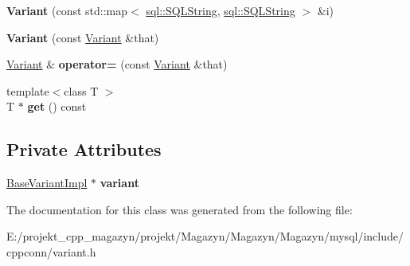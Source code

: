 \begin{DoxyCompactItemize}
{\bfseries Variant} (const std\+::map$<$ \hyperlink{classsql_1_1_s_q_l_string}{sql\+::\+S\+Q\+L\+String}, \hyperlink{classsql_1_1_s_q_l_string}{sql\+::\+S\+Q\+L\+String} $>$ \&i)
\item 
\hypertarget{classsql_1_1_variant_ad3c0e0299b1a39feb507cf435143262a}{}\label{classsql_1_1_variant_ad3c0e0299b1a39feb507cf435143262a} 
{\bfseries Variant} (const \hyperlink{classsql_1_1_variant}{Variant} \&that)
\item 
\hypertarget{classsql_1_1_variant_a3776937e0bb01168bba0fd1ddec56718}{}\label{classsql_1_1_variant_a3776937e0bb01168bba0fd1ddec56718} 
\hyperlink{classsql_1_1_variant}{Variant} \& {\bfseries operator=} (const \hyperlink{classsql_1_1_variant}{Variant} \&that)
\item 
\hypertarget{classsql_1_1_variant_ab5e2e01b0fe270c02f97183de2fc8ffb}{}\label{classsql_1_1_variant_ab5e2e01b0fe270c02f97183de2fc8ffb} 
{\footnotesize template$<$class T $>$ }\\T $\ast$ {\bfseries get} () const
\end{DoxyCompactItemize}
\subsection*{Private Attributes}
\begin{DoxyCompactItemize}
\item 
\hypertarget{classsql_1_1_variant_a6c25156805d59d4725f03635a8b18160}{}\label{classsql_1_1_variant_a6c25156805d59d4725f03635a8b18160} 
\hyperlink{classsql_1_1_base_variant_impl}{Base\+Variant\+Impl} $\ast$ {\bfseries variant}
\end{DoxyCompactItemize}


The documentation for this class was generated from the following file\+:\begin{DoxyCompactItemize}
\item 
E\+:/projekt\+\_\+cpp\+\_\+magazyn/projekt/\+Magazyn/\+Magazyn/\+Magazyn/mysql/include/cppconn/variant.\+h\end{DoxyCompactItemize}
